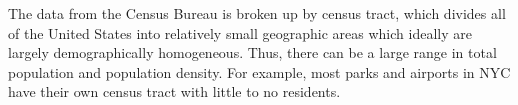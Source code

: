\documentclass[11pt]{article}
\begin{document}
The data from the Census Bureau is broken up by census tract, which divides all of the United States into relatively small geographic areas which ideally are largely demographically homogeneous.
Thus, there can be a large range in total population and population density.
For example, most parks and airports in NYC have their own census tract with little to no residents.

  

\end{document}
